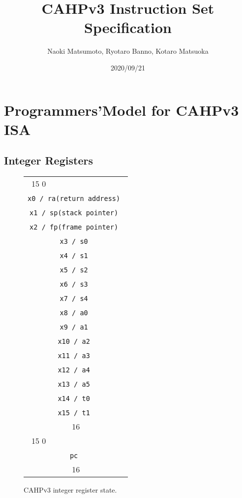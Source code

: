 \documentclass[a4paper,10pt]{article}
\title{CAHPv3 Instruction Set Specification}
\author{Naoki Matsumoto, Ryotaro Banno, Kotaro Matsuoka}
\date{2020/09/21}
\newcommand{\instbit}[1]{\mbox{\scriptsize #1}}
\newcommand{\instbitrange}[2]{~\instbit{#1} \hfill \instbit{#2}~}
\newcommand{\reglabel}[1]{\hfill {\tt #1}\hfill\ }
\begin{document}
\maketitle
\clearpage

\section{Programmers’Model for CAHPv3 ISA}
\subsection{Integer Registers}
\begin{figure}[H]
    {\footnotesize
    \begin{center}
    \begin{tabular}{p{2in}}
    \instbitrange{15}{0} \\ \cline{1-1}
    \multicolumn{1}{|c|}{\reglabel{x0 / ra(return address)}} \\ \cline{1-1}
    \multicolumn{1}{|c|}{\reglabel{x1 / sp(stack pointer)}}  \\ \cline{1-1}
    \multicolumn{1}{|c|}{\reglabel{x2 / fp(frame pointer)}}  \\ \cline{1-1}
    \multicolumn{1}{|c|}{\reglabel{x3 / s0}} \\ \cline{1-1}
    \multicolumn{1}{|c|}{\reglabel{x4 / s1}} \\ \cline{1-1}
    \multicolumn{1}{|c|}{\reglabel{x5 / s2}} \\ \cline{1-1}
    \multicolumn{1}{|c|}{\reglabel{x6 / s3}} \\ \cline{1-1}
    \multicolumn{1}{|c|}{\reglabel{x7 / s4}} \\ \cline{1-1}
    \multicolumn{1}{|c|}{\reglabel{x8 / a0}} \\ \cline{1-1}
    \multicolumn{1}{|c|}{\reglabel{x9 / a1}} \\ \cline{1-1}
    \multicolumn{1}{|c|}{\reglabel{x10 / a2}} \\ \cline{1-1}
    \multicolumn{1}{|c|}{\reglabel{x11 / a3}} \\ \cline{1-1}
    \multicolumn{1}{|c|}{\reglabel{x12 / a4}} \\ \cline{1-1}
    \multicolumn{1}{|c|}{\reglabel{x13 / a5}} \\ \cline{1-1}
    \multicolumn{1}{|c|}{\reglabel{x14 / t0}} \\ \cline{1-1}
    \multicolumn{1}{|c|}{\reglabel{x15 / t1}} \\ \cline{1-1}
    \multicolumn{1}{c}{16} \\

    \instbitrange{15}{0} \\ \cline{1-1}
    \multicolumn{1}{|c|}{\reglabel{pc}} \\ \cline{1-1}
    \multicolumn{1}{c}{16} \\
    \end{tabular}
    \end{center}
    }
    \caption{CAHPv3 integer register state.}
    \label{gprs}
\end{figure}
\end{document}
